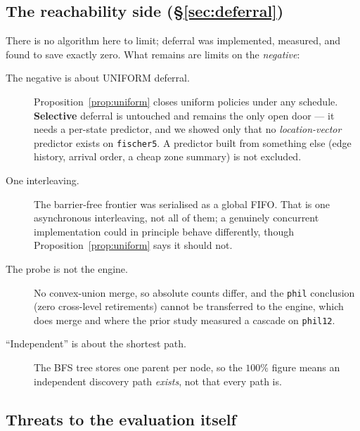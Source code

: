 \subsection{The reachability side (\S\ref{sec:deferral})}

There is no algorithm here to limit; deferral was implemented, measured, and found to save exactly
zero. What remains are limits on the \emph{negative}:

\begin{description}
  \item[The negative is about UNIFORM deferral.] Proposition~\ref{prop:uniform} closes uniform
        policies under any schedule. \textbf{Selective} deferral is untouched and remains the only
        open door --- it needs a per-state predictor, and we showed only that no
        \emph{location-vector} predictor exists on \texttt{fischer5}. A predictor built from
        something else (edge history, arrival order, a cheap zone summary) is not excluded.
  \item[One interleaving.] The barrier-free frontier was serialised as a global FIFO. That is one
        asynchronous interleaving, not all of them; a genuinely concurrent implementation could in
        principle behave differently, though Proposition~\ref{prop:uniform} says it should not.
  \item[The probe is not the engine.] No convex-union merge, so absolute counts differ, and the
        \texttt{phil} conclusion (zero cross-level retirements) cannot be transferred to the engine,
        which does merge and where the prior study measured a cascade on \texttt{phil12}.
  \item[``Independent'' is about the shortest path.] The BFS tree stores one parent per node, so the
        $100\%$ figure means an independent discovery path \emph{exists}, not that every path is.
\end{description}

\subsection{Threats to the evaluation itself}

